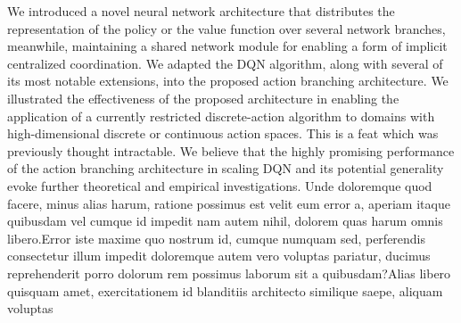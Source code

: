 \documentclass[letterpaper]{article}
\begin{document}
We introduced a novel neural network architecture that distributes the representation of the policy or the value function over several network branches, meanwhile, maintaining a shared network module for enabling a form of implicit centralized coordination. We adapted the DQN algorithm, along with several of its most notable extensions, into the proposed action branching architecture. We illustrated the effectiveness of the proposed architecture in enabling the application of a currently restricted discrete-action algorithm to domains with high-dimensional discrete or continuous action spaces. This is a feat which was previously thought intractable. We believe that the highly promising performance of the action branching architecture in scaling DQN and its potential generality evoke further theoretical and empirical investigations.  Unde doloremque quod facere, minus alias harum, ratione possimus est velit eum error a, aperiam itaque quibusdam vel cumque id impedit nam autem nihil, dolorem quas harum omnis libero.Error iste maxime quo nostrum id, cumque numquam sed, perferendis consectetur illum impedit doloremque autem vero voluptas pariatur, ducimus reprehenderit porro dolorum rem possimus laborum sit a quibusdam?Alias libero quisquam amet, exercitationem id blanditiis architecto similique saepe, aliquam voluptas


\end{document}
